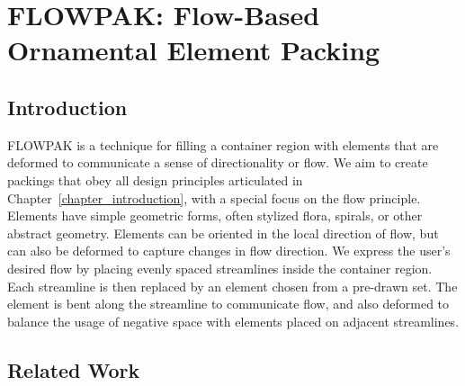 \chapter
{FLOWPAK: Flow-Based Ornamental Element Packing}
\label{chapter_flowpak}








\section{Introduction}
\label{flowpak_introduction}





\newtext
{
FLOWPAK is a technique for filling a container 
region with elements that are deformed 
to communicate a sense of directionality or flow.
We aim to create packings that obey all design principles articulated in Chapter~\ref{chapter_introduction},
with a special focus on the flow principle.
Elements have simple geometric forms, often stylized flora, spirals, or other abstract geometry. 
}
Elements can be oriented in the local direction 
of flow, but can also be deformed to capture changes in flow direction.
We express the user's desired flow by placing evenly spaced streamlines
inside the container region.  Each streamline is then replaced by an
element chosen from a pre-drawn set.  The element is bent along the streamline
to communicate flow, and also deformed to balance the usage of negative space
with elements placed on adjacent streamlines.  




\section{Related Work}
\label{flowpak_previous_work}


